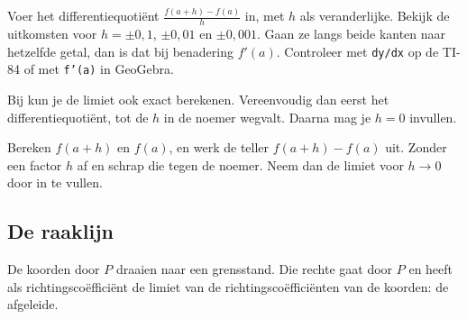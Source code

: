 \begin{werkwijze}
Voer het differentiequotiënt $\frac{f(a + h) - f(a)}{h}$ in, met $h$ als veranderlijke. Bekijk de uitkomsten voor $h = \pm 0{,}1$, $\pm 0{,}01$ en $\pm 0{,}001$. Gaan ze langs beide kanten naar hetzelfde getal, dan is dat bij benadering $f'(a)$. Controleer met \texttt{dy/dx} op de TI-84 of met \texttt{f'(a)} in GeoGebra.
\end{werkwijze}

\begin{oefeningen}
\end{oefeningen}

Bij  kun je de limiet ook exact berekenen. Vereenvoudig dan eerst het differentiequotiënt, tot de $h$ in de noemer wegvalt. Daarna mag je $h = 0$ invullen.


\begin{werkwijze}
Bereken $f(a + h)$ en $f(a)$, en werk de teller $f(a + h) - f(a)$ uit. Zonder een factor $h$ af en schrap die tegen de noemer. Neem dan de limiet voor $h \to 0$ door in te vullen.
\end{werkwijze}

\begin{oefeningen}
\end{oefeningen}

\subsection{De raaklijn}

De koorden door $P$ draaien naar een grensstand. Die rechte gaat door $P$ en heeft als richtingscoëfficiënt de limiet van de richtingscoëfficiënten van de koorden: de afgeleide.

